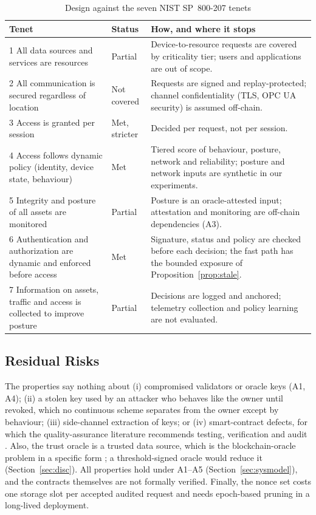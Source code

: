\begin{table}[t]
\centering
\caption{Design against the seven NIST SP~800-207 tenets}
\label{tab:tenets}
\scriptsize
\begin{tabular}{@{}p{2.2cm}p{1.1cm}p{3.6cm}@{}}
\toprule
\textbf{Tenet} & \textbf{Status} & \textbf{How, and where it stops} \\
\midrule
1 All data sources and services are resources & Partial & Device-to-resource requests are covered by criticality tier; users and applications are out of scope. \\
2 All communication is secured regardless of location & Not covered & Requests are signed and replay-protected; channel confidentiality (TLS, OPC UA security) is assumed off-chain. \\
3 Access is granted per session & Met, stricter & Decided per request, not per session. \\
4 Access follows dynamic policy (identity, device state, behaviour) & Met & Tiered score of behaviour, posture, network and reliability; posture and network inputs are synthetic in our experiments. \\
5 Integrity and posture of all assets are monitored & Partial & Posture is an oracle-attested input; attestation and monitoring are off-chain dependencies (A3). \\
6 Authentication and authorization are dynamic and enforced before access & Met & Signature, status and policy are checked before each decision; the fast path has the bounded exposure of Proposition~\ref{prop:stale}. \\
7 Information on assets, traffic and access is collected to improve posture & Partial & Decisions are logged and anchored; telemetry collection and policy learning are not evaluated. \\
\bottomrule
\end{tabular}
\end{table}

\subsection{Residual Risks}\label{sec:residual}
The properties say nothing about (i) compromised validators or oracle keys (A1, A4); (ii) a stolen key used by an attacker who behaves like the owner until revoked, which no continuous scheme separates from the owner except by behaviour; (iii) side-channel extraction of keys; or (iv) smart-contract defects, for which the quality-assurance literature recommends testing, verification and audit \cite{wei2024quality}. Also, the trust oracle is a trusted data source, which is the blockchain-oracle problem in a specific form \cite{hassan2023oracle}; a threshold-signed oracle would reduce it (Section~\ref{sec:disc}). All properties hold under A1--A5 (Section~\ref{sec:sysmodel}), and the contracts themselves are not formally verified. Finally, the nonce set costs one storage slot per accepted audited request and needs epoch-based pruning in a long-lived deployment.
